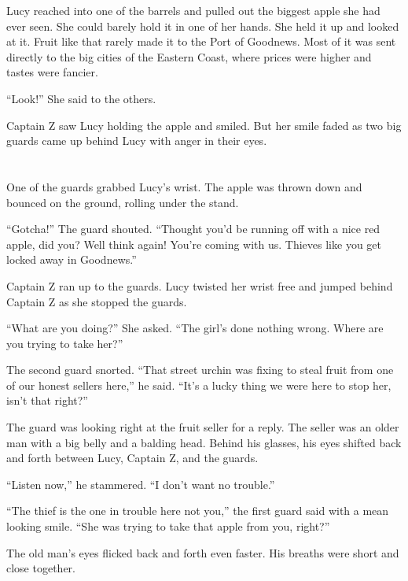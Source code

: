 \documentclass[12pt]{extbook}
\begin{document}
  Lucy reached into one of the barrels and pulled out the biggest apple
  she had ever seen. She could barely hold it in one of her hands. She
  held it up and looked at it. Fruit like that rarely made it to the Port
  of Goodnews. Most of it was sent directly to the big cities of the
  Eastern Coast, where prices were higher and tastes were fancier.
  
  \enquote{Look!} She said to the others.
  
  Captain Z saw Lucy holding the apple and smiled. But her smile faded as
  two big guards came up behind Lucy with anger in their eyes.
  
  \section{}\label{section-31}
  
  One of the guards grabbed Lucy's wrist. The apple was thrown down and
  bounced on the ground, rolling under the stand.
  
  \enquote{Gotcha!} The guard shouted. \enquote{Thought you'd be running
  off with a nice red apple, did you? Well think again! You're coming with
  us. Thieves like you get locked away in Goodnews.}
  
  Captain Z ran up to the guards. Lucy twisted her wrist free and jumped
  behind Captain Z as she stopped the guards.
  
  \enquote{What are you doing?} She asked. \enquote{The girl's done
  nothing wrong. Where are you trying to take her?}
  
  The second guard snorted. \enquote{That street urchin was fixing to
  steal fruit from one of our honest sellers here,} he said. \enquote{It's
  a lucky thing we were here to stop her, isn't that right?}
  
  The guard was looking right at the fruit seller for a reply. The seller
  was an older man with a big belly and a balding head. Behind his
  glasses, his eyes shifted back and forth between Lucy, Captain Z, and
  the guards.
  
  \enquote{Listen now,} he stammered. \enquote{I don't want no trouble.}
  
  \enquote{The thief is the one in trouble here not you,} the first guard
  said with a mean looking smile. \enquote{She was trying to take that
  apple from you, right?}
  
  The old man's eyes flicked back and forth even faster. His breaths were
  short and close together.
  
\end{document}
